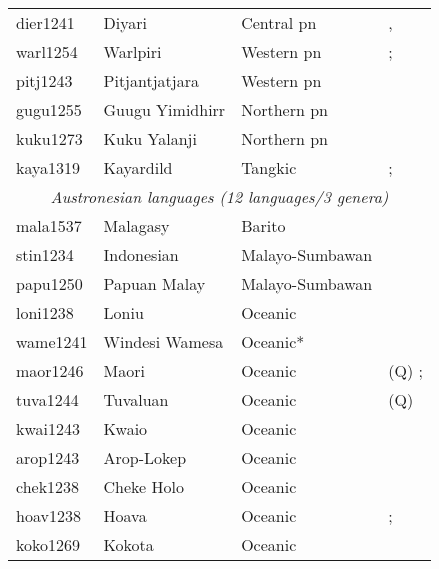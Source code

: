 \documentclass[A4paper]{article}
\begin{document}
\begin{longtable}{p{.11\linewidth}p{.2\linewidth}p{.24\linewidth}p{.35\linewidth}}
dier1241	& Diyari 		& Central \gls{pn} 		& \citealp[97f.]{austin1981}, \citep[102f.]{austin2013}\\
warl1254	& Warlpiri 		& Western \gls{pn} 		& \citealp[70]{reece1970}; \citealp[316f.]{hale1973}\\
pitj1243	& Pitjantjatjara 	& Western \gls{pn} 		& \citealp[49--51]{bowe1990}\\
gugu1255	& Guugu Yimidhirr 	& Northern \gls{pn} 	& \citealp[104, 156f.]{haviland1979}\\
kuku1273	& Kuku Yalanji 		& Northern \gls{pn} 	& \citealp[120f., 202f.]{patz2002}\\
kaya1319	& Kayardild 		& Tangkic 		& \citealp[239; 251]{evans1995}; \citealt[141]{round2013}\\
\midrule
\multicolumn{4}{c}{{\emph{Austronesian languages (12 languages/3 genera)}}}\\
\midrule
mala1537	& Malagasy 		& Barito	 	& \citealp{paultravis2019}\\
stin1234	& Indonesian 		& Malayo-Sumbawan 	& \citealp[170]{sneddon1996}\\
papu1250	& Papuan Malay 		& Malayo-Sumbawan 	& \citealp[ch. 6.2]{kluge2017}\\
loni1238	& Loniu			& Oceanic 		& \citealp[90]{hamel1994}\\
wame1241	& Windesi Wamesa 	& Oceanic* 		& \citealp[144]{gasser2014}\\
maor1246	& Maori 		& Oceanic 		& (Q) \citealp[368, 373]{bauer1993}; \citealp[262f.]{bauer1997}\\
tuva1244	& Tuvaluan 		& Oceanic 		& (Q) \citealp[392f.]{besnier2000}\\
kwai1243	& Kwaio 		& Oceanic 		& \citealp[104]{keesing1985}\\
arop1243	& Arop-Lokep		& Oceanic		& \citealp[255]{djernes2002}\\
chek1238	& Cheke Holo		& Oceanic		& \citealp[165]{boswell2018}\\
hoav1238	& Hoava 		& Oceanic		& \citealp[47]{davis2003}; \citealp{palmer2017}\\
koko1269	& Kokota		& Oceanic		& \citealp[68, 95, 116, 119, 123, 131, 137, 163, 242, 300, 305, 327, 399, 414]{palmer2008}\\

\end{longtable}
\end{document}
